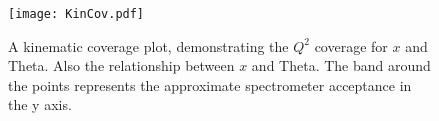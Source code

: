 \begin{figure}[h]
	\hspace*{-2.cm} 
	\centering
	\texttt{[image: KinCov.pdf]}
	\caption{A kinematic coverage plot, demonstrating the $Q^2$ coverage for $x$ and Theta. Also the relationship between $x$ and Theta. The band around the points represents the approximate spectrometer acceptance in the y axis.}
	\label{fig:kincov}
\end{figure}